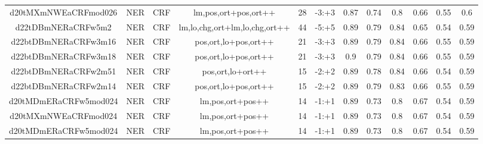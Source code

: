 \documentclass[a4paper]{article}
\begin{document}
\begin{landscape}
\begin{center}
\begin{tabular}{ |c|c|c|c|c|c|c|c|c|c|c|c|}
 
 	
 	\small{ d20tMXmNWEaCRFmod026 } & \small{ NER} & \small{  CRF }  & lm,pos,ort+pos,ort++  &  28 &  \small{  -3:+3 }  &  0.87 & 0.74 & 0.8  &  0.66 & 0.55 & 0.6 \\
 	

 
 	
 	\small{ d22tDBmNERaCRFw5m2 } & \small{ NER} & \small{  CRF }  & lm,lo,chg,ort+lm,lo,chg,ort++  &  44 &  \small{  -5:+5 }  &  0.89 & 0.79 & 0.84  &  0.65 & 0.54 & 0.59 \\
 	

 
 	
 	\small{ d22btDBmNERaCRFw3m16 } & \small{ NER} & \small{  CRF }  & pos,ort,lo+pos,ort++  &  21 &  \small{  -3:+3 }  &  0.89 & 0.79 & 0.84  &  0.66 & 0.55 & 0.59 \\
 	

 
 	
 	\small{ d22btDBmNERaCRFw3m18 } & \small{ NER} & \small{  CRF }  & pos,ort,lo+pos,ort++  &  21 &  \small{  -3:+3 }  &  0.9 & 0.79 & 0.84  &  0.66 & 0.55 & 0.59 \\
 	

 
 	
 	\small{ d22btDBmNERaCRFw2m51 } & \small{ NER} & \small{  CRF }  & pos,ort,lo+ort++  &  15 &  \small{  -2:+2 }  &  0.89 & 0.78 & 0.84  &  0.66 & 0.54 & 0.59 \\
 	

 
 	
 	\small{ d22btDBmNERaCRFw2m14 } & \small{ NER} & \small{  CRF }  & pos,ort,lo+pos,ort++  &  15 &  \small{  -2:+2 }  &  0.89 & 0.79 & 0.83  &  0.66 & 0.55 & 0.59 \\
 	

 
 	
 	\small{ d20tMDmERaCRFw5mod024 } & \small{ NER} & \small{  CRF }  & lm,pos,ort+pos++  &  14 &  \small{  -1:+1 }  &  0.89 & 0.73 & 0.8  &  0.67 & 0.54 & 0.59 \\
 	

 
 	
 	\small{ d20tMXmNWEaCRFmod024 } & \small{ NER} & \small{  CRF }  & lm,pos,ort+pos++  &  14 &  \small{  -1:+1 }  &  0.89 & 0.73 & 0.8  &  0.67 & 0.54 & 0.59 \\
 	

 
 	
 	\small{ d20tMDmERaCRFw5mod024 } & \small{ NER} & \small{  CRF }  & lm,pos,ort+pos++  &  14 &  \small{  -1:+1 }  &  0.89 & 0.73 & 0.8  &  0.67 & 0.54 & 0.59 \\
 	


\end{tabular}
\end{center}
\end{landscape}
\end{document}
